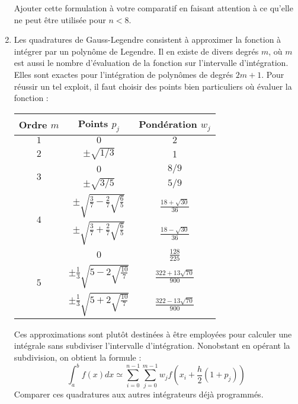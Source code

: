 \begin{enumerate}
Ajouter cette formulation à votre  comparatif en faisant attention à
ce qu'elle ne peut être utilisée pour $n<8$.
\item  Les quadratures  de Gauss-Legendre  consistent à  approximer la
  fonction à  intégrer par un  polynôme de  Legendre. Il en  existe de
  divers degrés  $m$, où $m$  est aussi  le nombre d'évaluation  de la
  fonction sur  l'intervalle d'intégration.   Elles sont  exactes pour
  l'intégration de  polynômes de  degrés $2m+1$.  Pour réussir  un tel
  exploit, il faut choisir des  points bien particuliers où évaluer la
  fonction :
\begin{center}
\begin{tabular}{ccc}
Ordre $m$& Points $p_j$ &Pondération $w_j$\\
\hline\hline
\strut$1$ & $0$ & $2$ \\\hline
\strut$2$ & $\pm \sqrt{1/3}$ & 1\\\hline
\multirow{2}{*}{$3$} &  $0$              & $8/9$\\
                     & $\pm\sqrt{3/5}$   & $5/9$\\\hline
\multirow{2}{*}{$4$} &  $\pm\sqrt{\frac{3}{7}-\frac{2}{7}\sqrt{\frac{6}{5}}}$              & $\frac{18+\sqrt{30}}{36}$\\
                     &  $\pm\sqrt{\frac{3}{7}+\frac{2}{7}\sqrt{\frac{6}{5}}}$              & $\frac{18-\sqrt{30}}{36}$\\\hline
\multirow{3}{*}{$5$} & $0$ & $\frac{128}{225}$\\
                     &  $\pm\frac{1}{3}\sqrt{5-2\sqrt{\frac{10}{7}}}$ & $\frac{322+13\sqrt{70}}{900}$\\
                     &  $\pm\frac{1}{3}\sqrt{5+2\sqrt{\frac{10}{7}}}$ & $\frac{322-13\sqrt{70}}{900}$\\

\end{tabular}
\end{center}
Ces  approximations  sont  plutôt  destinées  à  être  employées  pour
calculer     une     intégrale    sans     subdiviser     l'intervalle
d'intégration.  Nonobstant en  opérant  la subdivision,  on obtient  la
formule :
\begin{equation}
\int_a^b   f(x)dx   \simeq   \sum_{i=0}^{n-1}   \sum_{j=0}^{m-1}   w_j
f(x_i+\frac{h}{2}(1+p_j))
\end{equation}
Comparer  ces  quadratures  aux autres  intégrateurs  déjà  programmés.\\

 



\end{enumerate}
